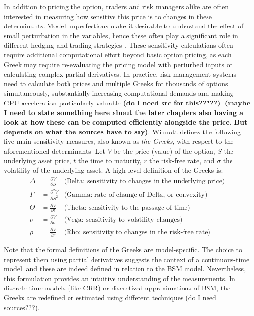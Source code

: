 \documentclass[english,12pt,a4paper,pdftex,sci,utf8]{aaltothesis}
\begin{document}
In addition to pricing the option, traders and risk managers alike are often interested in measuring how sensitive this price is to changes in these determinants. Model imperfections make it desirable to understand the effect of small perturbation in the variables, hence these often play a significant role in different hedging and trading strategies \cite{hull2016options}. These sensitivity calculations often require additional computational effort beyond basic option pricing, as each Greek may require re-evaluating the pricing model with perturbed inputs or calculating complex partial derivatives. In practice, risk management systems need to calculate both prices and multiple Greeks for thousands of options simultaneously, substantially increasing computational demands and making GPU acceleration particularly valuable \textbf{(do I need src for this?????)}. \textbf{(maybe I need to state something here about the later chapters also having a look at how these can be computed efficiently alongside the price. But depends on what the sources have to say)}. Wilmott \cite{wilmott2013paul} defines the following five main sensitivity measures, also known as \emph{the Greeks}, with respect to the aforementioned determinants. Let $V$ be the price (value) of the option, $S$ the underlying asset price, $t$ the time to maturity, $r$ the risk-free rate, and $\sigma$ the volatility of the underlying asset. A high-level definition of the Greeks is:
\begin{align*}
    \Delta &= \frac{\partial V}{\partial S} & \text{(Delta: sensitivity to changes in the underlying price)} \\[0.5em]
    \Gamma &= \frac{\partial^2 V}{\partial S^2} & \text{(Gamma: rate of change of Delta, or convexity)} \\[0.5em]
    \Theta &= \frac{\partial V}{\partial t} & \text{(Theta: sensitivity to the passage of time)} \\[0.5em]
    \nu &= \frac{\partial V}{\partial \sigma} & \text{(Vega: sensitivity to volatility changes)} \\[0.5em]
    \rho &= \frac{\partial V}{\partial r} & \text{(Rho: sensitivity to changes in the risk-free rate)}
\end{align*}

Note that the formal definitions of the Greeks are model-specific. The choice to represent them using partial derivatives suggests the context of a continuous-time model, and these are indeed defined in relation to the BSM model. Nevertheless, this formulation provides an intuitive understanding of the measurements. In discrete-time models (like CRR) or discretized approximations of BSM, the Greeks are redefined or estimated using different techniques (do I need sources???).
\end{document}
